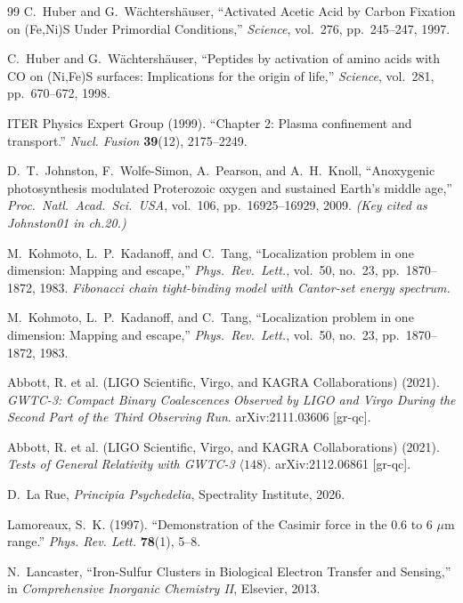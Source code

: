 \documentclass[12pt,oneside]{book}
\begin{document}
\begin{thebibliography}{99}
C.~Huber and G.~W\"achtersh\"auser,
``Activated Acetic Acid by Carbon Fixation on (Fe,Ni)S Under Primordial Conditions,''
\emph{Science}, vol.~276, pp.~245--247, 1997.

C.~Huber and G.~W\"achtersh\"auser,
``Peptides by activation of amino acids with CO on (Ni,Fe)S surfaces:
Implications for the origin of life,''
\emph{Science}, vol.~281, pp.~670--672, 1998.

ITER Physics Expert Group (1999).
``Chapter 2: Plasma confinement and transport.''
\textit{Nucl. Fusion} \textbf{39}(12), 2175--2249.

D.~T.~Johnston, F.~Wolfe-Simon, A.~Pearson, and A.~H.~Knoll,
``Anoxygenic photosynthesis modulated Proterozoic oxygen and sustained Earth's middle age,''
\emph{Proc.\ Natl.\ Acad.\ Sci.\ USA}, vol.~106, pp.~16925--16929, 2009.
\textit{(Key cited as Johnston01 in ch.20.)}

M.~Kohmoto, L.~P.~Kadanoff, and C.~Tang,
``Localization problem in one dimension: Mapping and escape,''
\emph{Phys.\ Rev.\ Lett.}, vol.~50, no.~23, pp.~1870--1872, 1983.
\textit{Fibonacci chain tight-binding model with Cantor-set energy spectrum.}

M.~Kohmoto, L.~P.~Kadanoff, and C.~Tang,
``Localization problem in one dimension: Mapping and escape,''
\emph{Phys.\ Rev.\ Lett.}, vol.~50, no.~23, pp.~1870--1872, 1983.

Abbott, R. et al. (LIGO Scientific, Virgo, and KAGRA Collaborations) (2021).
\textit{GWTC-3: Compact Binary Coalescences Observed by LIGO and Virgo During the Second Part of the Third Observing Run}.
arXiv:2111.03606 [gr-qc].

Abbott, R. et al. (LIGO Scientific, Virgo, and KAGRA Collaborations) (2021).
\textit{Tests of General Relativity with GWTC-3} $\langle 148 \rangle$.
arXiv:2112.06861 [gr-qc].

D.~La Rue,
\emph{Principia Psychedelia},
Spectrality Institute, 2026.

Lamoreaux, S.~K. (1997).
``Demonstration of the Casimir force in the 0.6 to 6 $\mu$m range.''
\textit{Phys. Rev. Lett.} \textbf{78}(1), 5--8.

N.~Lancaster,
``Iron-Sulfur Clusters in Biological Electron Transfer and Sensing,''
in \emph{Comprehensive Inorganic Chemistry II}, Elsevier, 2013.


\end{thebibliography}
\end{document}
